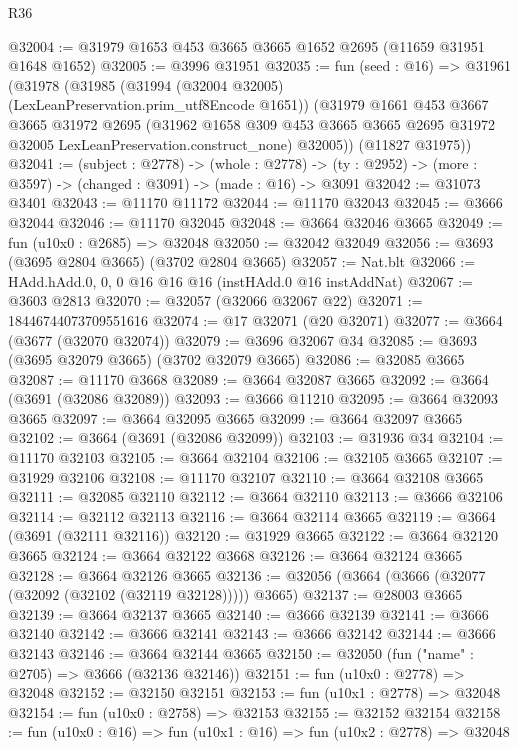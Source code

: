 \begin{lexlean}{R36}
\begin{coremodule}
@32004 := @31979 @1653 @453 @3665 @3665 @1652 @2695 (@11659 @31951 @1648 @1652)
@32005 := @3996 @31951
@32035 := fun (seed : @16) =>
  @31961
    (@31978
      (@31985
        (@31994 (@32004 @32005) (LexLeanPreservation.prim_utf8Encode @1651))
        (@31979
          @1661
          @453
          @3667
          @3665
          @31972
          @2695
          (@31962
            @1658
            @309
            @453
            @3665
            @3665
            @2695
            @31972
            @32005
            LexLeanPreservation.construct_none)
          @32005))
      (@11827 @31975))
@32041 := (subject : @2778) ->
  (whole : @2778) -> (ty : @2952) -> (more : @3597) -> (changed : @3091) -> (made : @16) -> @3091
@32042 := @31073 @3401
@32043 := @11170 @11172
@32044 := @11170 @32043
@32045 := @3666 @32044
@32046 := @11170 @32045
@32048 := @3664 @32046 @3665
@32049 := fun (u10x0 : @2685) => @32048
@32050 := @32042 @32049
@32056 := @3693 (@3695 @2804 @3665) (@3702 @2804 @3665)
@32057 := Nat.blt
@32066 := HAdd.hAdd.{0, 0, 0} @16 @16 @16 (instHAdd.{0} @16 instAddNat)
@32067 := @3603 @2813
@32070 := @32057 (@32066 @32067 @22)
@32071 := 18446744073709551616
@32074 := @17 @32071 (@20 @32071)
@32077 := @3664 (@3677 (@32070 @32074))
@32079 := @3696 @32067 @34
@32085 := @3693 (@3695 @32079 @3665) (@3702 @32079 @3665)
@32086 := @32085 @3665
@32087 := @11170 @3668
@32089 := @3664 @32087 @3665
@32092 := @3664 (@3691 (@32086 @32089))
@32093 := @3666 @11210
@32095 := @3664 @32093 @3665
@32097 := @3664 @32095 @3665
@32099 := @3664 @32097 @3665
@32102 := @3664 (@3691 (@32086 @32099))
@32103 := @31936 @34
@32104 := @11170 @32103
@32105 := @3664 @32104
@32106 := @32105 @3665
@32107 := @31929 @32106
@32108 := @11170 @32107
@32110 := @3664 @32108 @3665
@32111 := @32085 @32110
@32112 := @3664 @32110
@32113 := @3666 @32106
@32114 := @32112 @32113
@32116 := @3664 @32114 @3665
@32119 := @3664 (@3691 (@32111 @32116))
@32120 := @31929 @3665
@32122 := @3664 @32120 @3665
@32124 := @3664 @32122 @3668
@32126 := @3664 @32124 @3665
@32128 := @3664 @32126 @3665
@32136 := @32056 (@3664 (@3666 (@32077 (@32092 (@32102 (@32119 @32128))))) @3665)
@32137 := @28003 @3665
@32139 := @3664 @32137 @3665
@32140 := @3666 @32139
@32141 := @3666 @32140
@32142 := @3666 @32141
@32143 := @3666 @32142
@32144 := @3666 @32143
@32146 := @3664 @32144 @3665
@32150 := @32050 (fun ("name" : @2705) => @3666 (@32136 @32146))
@32151 := fun (u10x0 : @2778) => @32048
@32152 := @32150 @32151
@32153 := fun (u10x1 : @2778) => @32048
@32154 := fun (u10x0 : @2758) => @32153
@32155 := @32152 @32154
@32158 := fun (u10x0 : @16) => fun (u10x1 : @16) => fun (u10x2 : @2778) => @32048

\end{coremodule}
\end{lexlean}
